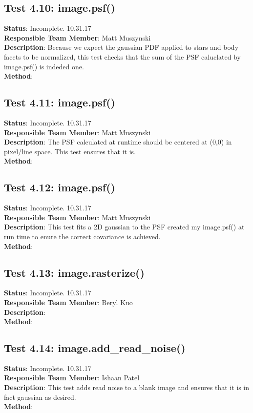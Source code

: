 \documentclass[]{DINOReportMemo}
\begin{document}
\subsection{Test 4.10: image.psf()}
\textbf{Status}: Incomplete. 10.31.17\\
\textbf{Responsible Team Member}: Matt Muszynski \\
\textbf{Description}: Because we expect the gaussian PDF applied to stars and body facets to be normalized, this test checks that the sum of the PSF caluclated by image.psf() is indeded one.\\
\textbf{Method}: \\

\subsection{Test 4.11: image.psf()}
\textbf{Status}: Incomplete. 10.31.17\\
\textbf{Responsible Team Member}: Matt Muszynski \\
\textbf{Description}: The PSF calculated at runtime should be centered at (0,0) in pixel/line space. This test ensures that it is.\\
\textbf{Method}: \\

\subsection{Test 4.12: image.psf()}
\textbf{Status}: Incomplete. 10.31.17\\
\textbf{Responsible Team Member}: Matt Muszynski \\
\textbf{Description}: This test fits a 2D gaussian to the PSF created my image.psf() at run time to enure the correct covariance is achieved.\\
\textbf{Method}: \\

\subsection{Test 4.13: image.rasterize()}
\textbf{Status}: Incomplete. 10.31.17\\
\textbf{Responsible Team Member}: Beryl Kuo \\
\textbf{Description}: \\
\textbf{Method}: \\

\subsection{Test 4.14: image.add\_read\_noise()}
\textbf{Status}: Incomplete. 10.31.17\\
\textbf{Responsible Team Member}: Ishaan Patel \\
\textbf{Description}: This test adds read noise to a blank image and ensures that it is in fact gaussian as desired.\\
\textbf{Method}: \\
\end{document}
